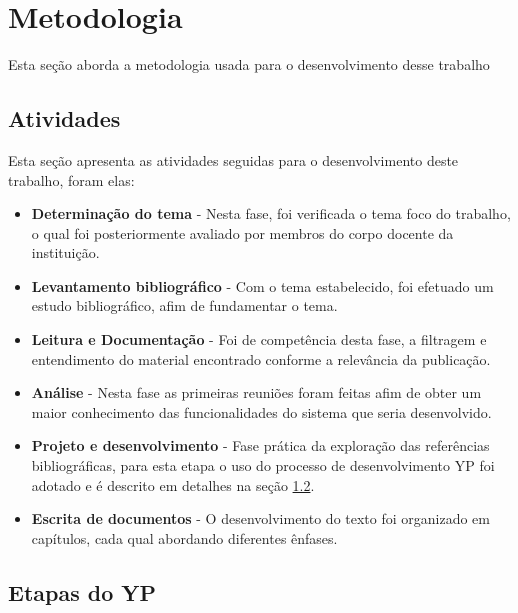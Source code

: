 \documentclass[a4paper,12pt]{monografia}
\begin{document}


\chapter{Metodologia} %
\label{cha:metodologia}

Esta seção aborda a metodologia usada para o desenvolvimento desse trabalho

\section{Atividades} %
\label{sec:atividades}

Esta seção apresenta as atividades seguidas para o desenvolvimento deste trabalho, foram elas:

\begin{itemize}
\item \textbf{Determinação do tema} - Nesta fase, foi verificada o tema foco do trabalho, o qual foi posteriormente avaliado por membros do corpo docente da instituição.

\item \textbf{Levantamento bibliográfico} - Com o tema estabelecido, foi efetuado um estudo bibliográfico, afim de fundamentar o tema.

\item \textbf{Leitura e Documentação} - Foi de competência desta fase, a filtragem e entendimento do material encontrado conforme a relevância da publicação.

\item \textbf{Análise} - Nesta fase as primeiras reuniões foram feitas afim de obter um maior conhecimento das funcionalidades do sistema que seria desenvolvido.

\item \textbf{Projeto e desenvolvimento} - Fase prática da exploração das referências bibliográficas, para esta etapa o uso do processo de desenvolvimento YP foi adotado e é descrito em detalhes na seção \ref{sec:processo_de_desenvolvimento}.

\item \textbf{Escrita de documentos} - O desenvolvimento do texto foi organizado em capítulos, cada qual abordando diferentes ênfases.

\end{itemize}

\section{Etapas do YP} %
\label{sec:processo_de_desenvolvimento}
\end{document}
